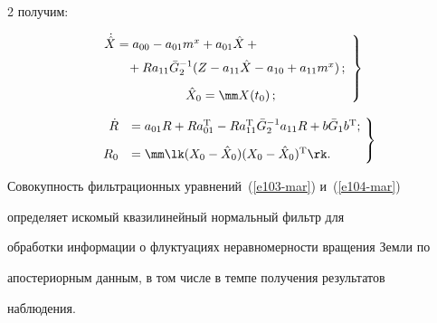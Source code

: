 \begin{multicols}{2}
получим:


\begin{equation}


\left.


\begin{array}{c}


\hspace*{-27mm}{\dot{\hat X}} = a_{00} - a_{01} m^x + a_{01} \hat X +{}\\[6pt]


\hspace*{3mm}{}+ R a_{11} \bar G_2^{-1}(Z-a_{11} \hat X - a_{10} + a_{11} m^x)\,;\\[9pt]


\hat X_0 =\mm X(t_0)\,;


\end{array}


\right\}


\label{e103-mar}


\end{equation}





\noindent


\begin{equation}


\!\left.


\begin{array}{rl}


\dot R &= a_{01} R + R a_{01}^{\mathrm{T}} - R a_{11}^{\mathrm{T}} 


\bar G_2^{-1} a_{11} R + b\bar G_1 b^{\mathrm{T}};\\[9pt]


R_0 &=\mm \lk (X_0 -\hat X_0)(X_0 -\hat X_0)^{\mathrm{T}}\rk.


\end{array}\!


\right\}\!\!


\label{e104-mar}


\end{equation}


Совокупность фильтрационных уравнений~(\ref{e103-mar}) и~(\ref{e104-mar}) 


определяет искомый квазилинейный нормальный фильтр для


обработки информации о флуктуациях неравномерности вращения Земли по


апостериорным данным, в том числе в темпе получения результатов


наблюдения.






\end{multicols}
